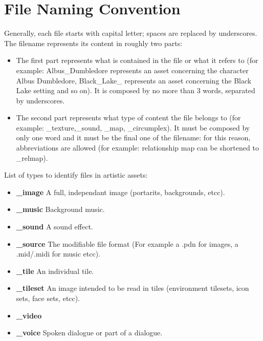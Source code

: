 \section{File Naming Convention}
Generally, each file starts with capital letter; spaces are replaced by underscores.
The filename represents its content in roughly two parts:

\begin{itemize}
	\item The first part represents what is contained in the file or what it refers to (for example: Albus\_Dumbledore represents an asset concerning the character Albus Dumbledore, Black\_Lake\_ represents an asset concerning the Black Lake setting and so on). It is composed by no more than 3 words, separated by underscores.
	\item The second part represents what type of content the file belongs to (for example: \_texture,\_sound, \_map, \_circumplex). It must be composed by only one word and it must be the final one of the filename: for this reason, abbreviations are allowed (for example: relationship map can be shortened to \_relmap).
\end{itemize}

List of types to identify files in artistic assets:
\begin{itemize}
	\item \textbf{\_image} A full, independant image (portarits, backgrounds, etcc).
	\item \textbf{\_music} Background music.
	\item \textbf{\_sound} A sound effect.
	\item \textbf{\_source} The modifiable file format (For example a .pdn for images, a .mid/.midi for music etcc).
	\item \textbf{\_tile} An individual tile.
	\item \textbf{\_tileset} An image intended to be read in tiles (environment tilesets, icon sets, face sets, etcc).
	\item \textbf{\_video}
	\item \textbf{\_voice} Spoken dialogue or part of a dialogue.
\end{itemize}

